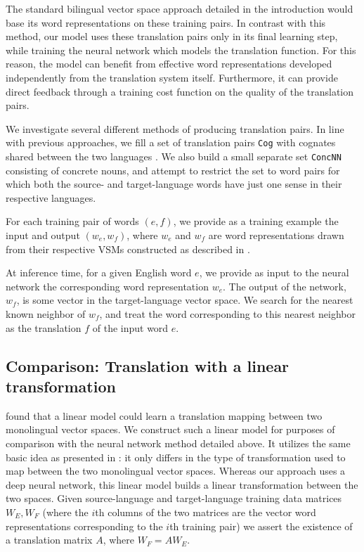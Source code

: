 \documentclass[11pt]{article}
\begin{document}
The standard bilingual vector space approach detailed in the introduction would
base its word representations on these training pairs. In contrast with this method,
our model uses these translation pairs only in its final learning step, while training
the neural network which models the translation function. For this reason, the model
can benefit from effective word representations developed independently from the
translation system itself. Furthermore, it can provide direct feedback through a training cost function
on the quality of the translation pairs.

We investigate several different methods 
of producing translation pairs.
In line with previous
approaches, we fill a set
of translation pairs
\texttt{Cog} with cognates shared between the two
languages \cite{koehn2002}. We also build a small separate set
\texttt{ConcNN}
consisting of concrete nouns, and attempt to restrict the set to word pairs for which
both the source- and target-language words have just one sense in their respective
languages.

For each training pair of words $(e, f)$, we provide as a training example the input and output $(w_e, w_f)$, where $w_e$ and $w_f$ are word representations
drawn from their respective VSMs constructed as described in .

At inference time, for a given English word $e$, we provide as input to the neural network
the corresponding word representation $w_e$. The output of the network, $w_f$, is some
vector in the target-language vector space. We search for the nearest known neighbor of
$w_f$, and treat the word corresponding to this nearest neighbor as the translation $f$
of the input word $e$.

\subsection{Comparison: Translation with a linear transformation}
\label{subsec:translation-linear}

 found that a linear model could learn a translation mapping
between two monolingual vector spaces. We construct such a linear model for purposes of
comparison with the neural network method detailed above. It utilizes
the same basic idea as presented in : it only differs in the type of
transformation used to map between the two monolingual vector spaces. Whereas our approach uses
a deep neural network, this linear model builds a linear transformation between the two spaces.
Given source-language and target-language training data matrices $W_E, W_F$ (where the $i$th
columns of the two matrices are the vector word representations corresponding to the $i$th
training pair) we assert the existence of a translation matrix $A$, where $W_F = AW_E$.
\end{document}
